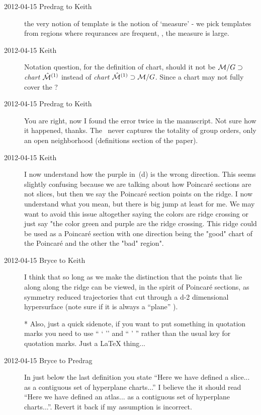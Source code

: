 \begin{description}
\item[2012-04-15 Predrag to Keith] the very notion of template is the
notion of `measure' - we pick templates from regions where requrances are
frequent, \ie, the measure is large.

\item[2012-04-15 Keith]  Notation question, for the definition of chart,
should it not be ${\cal M}/G \supset$ \emph{chart} $\hat{\cal M}{}^{(1)}$
instead of \emph{chart} $\hat{\cal M}{}^{(1)} \supset {\cal M}/G$.  Since a
chart may not fully cover the {\reducedsp}?

\item[2012-04-15 Predrag to Keith] You are right, now I found the error twice
in the manuscript. Not sure how it happened, thanks. The \slice\ never
captures the totality of group orders, only an open neighborhood
(definitions section of the paper).

\item[2012-04-15 Keith] I now understand how the purple in
\,(d) is the wrong direction.  This seems slightly
confusing because we are talking about how Poincar\'e sections are not
slices, but then we say the Poincar\'e section points on the ridge.  I
now understand what you mean, but there is big jump at least for me.  We
may want to avoid this issue altogether saying the colors are ridge
crossing or just say "the color green and purple are the ridge crossing.
This ridge could be used as a Poincar\'e section with one direction being
the "good" chart of the Poincar\'e and the other the "bad" region".

\item[2012-04-15 Bryce to Keith] I think that so long as we make the distinction that the points that lie along along the ridge can be viewed, in the spirit of Poincar\'{e} sections, as symmetry reduced trajectories that cut through a d-2 dimensional hypersurface (note sure if it is always a ``plane'' ).

* Also, just a quick sidenote, if you want to put something in quotation marks you need to use `` ` '' and `` ' '' rather than the usual key for quotation marks. Just a LaTeX thing...

\item[2012-04-15 Bryce to Predrag] In  just below the last definition you state ``Here we have defined a slice... as a contiguous set of hyperplane charts...'' I believe the it should read ``Here we have defined an atlas... as a contiguous set of hyperplane charts...''. Revert it back if my assumption is incorrect.


\end{description}
